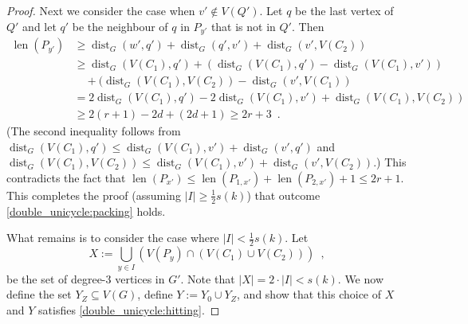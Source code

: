 \documentclass{patmorin}
\newcommand{\gwen}[1]{\textcolor{Purple}{Gwen: #1}}
\newcommand{\piotr}[1]{\textcolor{red}{Piotr: #1}}
\DeclareMathOperator{\len}{len}
\DeclareMathOperator{\dist}{dist}
\begin{document}
\begin{proof}
    Next we consider the case when $v'\notin V(Q')$.
    Let $q$ be the last vertex of $Q'$ and let $q'$ be the neighbour of $q$ in $P_{y'}$ that is not in $Q'$.  Then
    \begin{align*}
    \len(P_{y'})
        & \ge \dist_G(w',q') + \dist_G(q',v') + \dist_G(v',V(C_2)) \\
        & \ge \dist_G(V(C_1),q') + (\dist_G(V(C_1),q') - \dist_G(V(C_1),v')) \\
        & \quad {} + (\dist_G(V(C_1),V(C_2))-\dist_G(v',V(C_1)) \\
        & = 2\dist_G(V(C_1),q') - 2\dist_G(V(C_1),v') + \dist_G(V(C_1),V(C_2)) \\
        & \geq 2(r+1) - 2d + (2d+1) \geq 2r+3 \enspace .
    \end{align*}
    (The second inequality follows from $\dist_G(V(C_1),q')\leq \dist_G(V(C_1),v')+\dist_G(v',q')$ and
    $\dist_G(V(C_1),V(C_2))\le \dist_G(V(C_1),v')+\dist_G(v',V(C_2))$.) This contradicts the fact that $\len(P_{x'})\le \len(P_{1,x'})+\len(P_{2,x'})+1\le 2r+1$.  This completes the proof (assuming $|I|\ge\tfrac{1}{2}s(k)$) that outcome \cref{double_unicycle:packing} holds.


    What remains is to consider the case where $|I|<\frac{1}{2}s(k)$.  Let
    \[
      \textstyle X:=\bigcup_{y\in I}\left( V(P_y)\cap(V(C_1)\cup V(C_2))\right) \enspace ,
    \]
    be the set of degree-$3$ vertices in $G'$.
    Note that $|X| = 2\cdot|I| < s(k)$.
    We now define the set $Y_Z\subseteq V(G)$, define $Y:=Y_0\cup Y_Z$, and show that this choice of $X$ and $Y$ satisfies \cref{double_unicycle:hitting}.


\end{proof}
\end{document}
